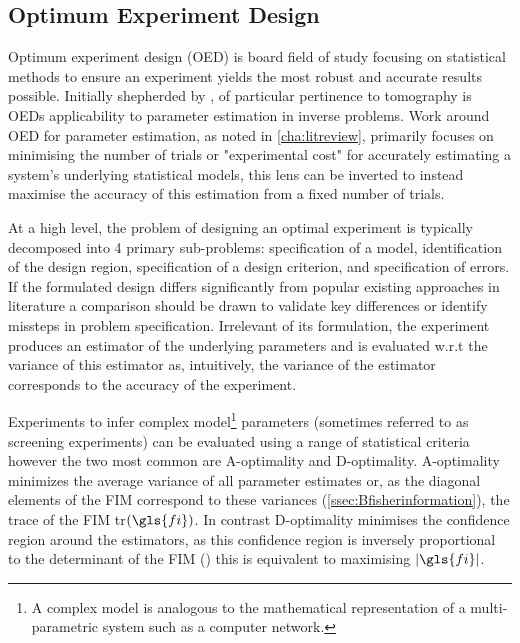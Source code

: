 \subsection{Optimum Experiment Design}
\label{ssec:Boptimumdesigns}

Optimum experiment design (OED) is board field of study focusing on statistical methods to ensure an experiment yields the most robust and accurate results possible. Initially shepherded by \cite{smith_standard_1918}, of particular pertinence to tomography is OEDs applicability to parameter estimation in inverse problems. Work around OED for parameter estimation, as noted in \cref{cha:litreview}, primarily focuses on minimising the number of trials or "experimental cost" for accurately estimating a system's underlying statistical models, this lens can be inverted to instead maximise the accuracy of this estimation from a fixed number of trials.\par
At a high level, the problem of designing an optimal experiment is typically decomposed into 4 primary sub-problems: specification of a model, identification of the design region, specification of a design criterion, and specification of errors. If the formulated design differs significantly from popular existing approaches in literature a comparison should be drawn to validate key differences or identify missteps in problem specification. Irrelevant of its formulation, the experiment produces an estimator of the underlying parameters and is evaluated w.r.t the variance of this estimator as, intuitively, the variance of the estimator corresponds to the accuracy of the experiment.\par
Experiments to infer complex model\footnote{A complex model is analogous to the mathematical representation of a multi-parametric system such as a computer network.} parameters (sometimes referred to as screening experiments) can be evaluated using a range of statistical criteria however the two most common are A-optimality and D-optimality. A-optimality minimizes the average variance of all parameter estimates or, as the diagonal elements of the FIM correspond to these variances (\cref{ssec:Bfisherinformation}), the trace of the FIM tr$\left(\gls{fi}\right)$. In contrast D-optimality minimises the confidence region around the estimators, as this confidence region is inversely proportional to the determinant of the FIM (\cite{jones_-optimal_2021}) this is equivalent to maximising $|\gls{fi}|$.\par


